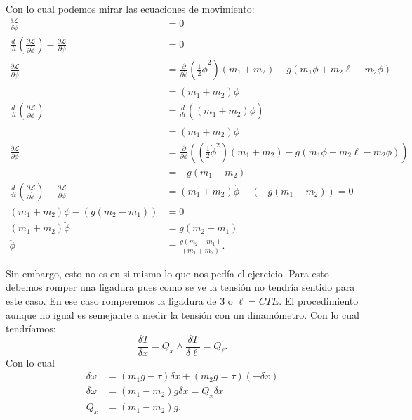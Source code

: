 \documentclass{report}
\begin{document}
Con lo cual podemos mirar las ecuaciones de movimiento:
\begin{align*}
  \frac{\delta \mathcal{L}}{\delta \phi} &= 0 \\
  \frac{d}{dt}\left( \frac{\partial \mathcal{L}}{\partial \dot{\phi}}  \right) - \frac{\partial \mathcal{L}}{\partial \phi} &= 0 \\
  \frac{\partial \mathcal{L}}{\partial \dot{\phi}} &= \frac{\partial}{\partial \dot{\phi}} \left( \frac{1}{2}\dot{\phi}^2 \right)\left( m_1 + m_2 \right) - g\left( m_1\phi + m_2\ell - m_2\phi \right) \\
						   &= \left( m_1 + m_2 \right) \dot{\phi} \\
  \frac{d}{dt}\left( \frac{\partial \mathcal{L}}{\partial \phi}  \right) &= \frac{d}{dt}\left( \left( m_1 + m_2 \right)\dot{\phi}  \right)  \\
									 &= \left( m_1 + m_2 \right) \ddot{\phi} \\
  \frac{\partial \mathcal{L}}{\partial \phi} &= \frac{\partial}{\partial \phi} \left(\left( \frac{1}{2}\dot{\phi}^2 \right)\left( m_1 + m_2 \right) - g\left( m_1\phi + m_2\ell - m_2\phi \right)  \right)  \\
  &= -g\left( m_1 - m_2 \right)  \\
  \frac{d}{dt}\left( \frac{\partial \mathcal{L}}{\partial \dot{\phi}}  \right) - \frac{\partial \mathcal{L}}{\partial \phi} &= \left( m_1 + m_2 \right) \ddot{\phi} - \left( -g\left( m_1 - m_2 \right) \right) = 0 \\
  \left( m_1 + m_2 \right) \ddot{\phi} - \left( g\left( m_2 - m_1 \right) \right) &= 0\\
  \left( m_1 + m_2 \right) \ddot{\phi} &= g\left( m_2 - m_1 \right)  \\
  \ddot{\phi} &= \frac{g\left( m_2 - m_1 \right) }{\left( m_1 + m_2 \right) }
.\end{align*}

Sin embargo, esto no es en si mismo lo que nos pedía el ejercicio. Para esto debemos romper una ligadura pues como se ve la tensión no tendría sentido para este caso. En ese caso romperemos la ligadura de 3 o $\ell = CTE$. El procedimiento aunque no igual es semejante a medir la tensión con un dinamómetro. Con lo cual tendríamos: \[
\frac{\delta T}{\delta x} = Q_x \land \frac{\delta T}{\delta \ell} = Q_{\ell}
.\] Con lo cual
\begin{align*}
  \delta \omega &= \left( m_1g - \tau \right) \delta x + \left(m_2g=\tau\right)\left(-\delta x \right)  \\
  \delta \omega &= \left( m_1 - m_2 \right) g \delta x = Q_x \delta x \\
  Q_x &= \left( m_1 - m_2 \right)g
.\end{align*}
\end{document}
